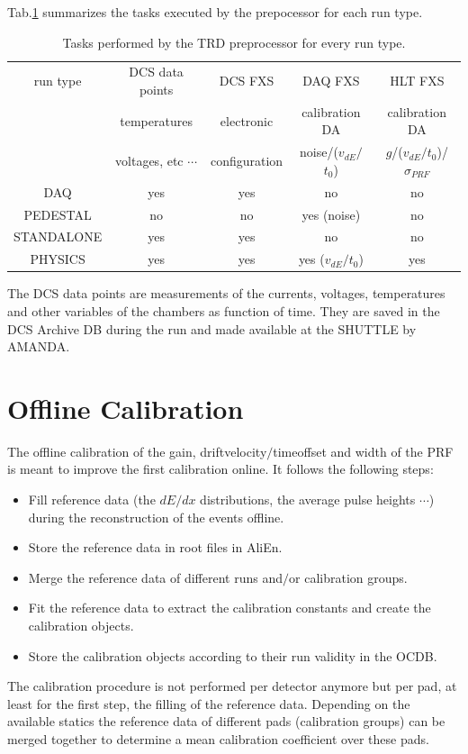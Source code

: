 \documentclass{alicetdr}
\begin{document}
Tab.\ref{taskruntype} summarizes the tasks executed by the prepocessor
for each run type.
\begin{table}[h]
\begin{center}
\begin{tabular} {|c|c|c|c|c|}
\hline run type & DCS data points  & DCS FXS & DAQ FXS & HLT FXS  \\
 & temperatures  & electronic  & calibration DA  & calibration DA   \\
 & voltages, etc $\cdots$  &  configuration & noise/($v_{dE}$$/$$t_{0}$)
& $g$/($v_{dE}$$/$$t_{0}$)/$\sigma_{PRF}$   \\
\hline DAQ   & yes & yes & no & no \\\hline
\hline PEDESTAL   & no & no & yes (noise) & no \\\hline
\hline STANDALONE & yes & yes & no & no \\\hline
\hline PHYSICS & yes & yes & yes ($v_{dE}$$/$$t_{0}$) & yes \\\hline
\end{tabular}
\caption{\label{taskruntype} Tasks performed by the TRD preprocessor
for every run type.}
\end{center}
\end{table}
The DCS data points are measurements of the currents, voltages,
temperatures and other variables of the chambers as function of time.
They are saved in the DCS Archive DB during the run and made available
at the SHUTTLE by AMANDA.
%
\section{Offline Calibration}
The offline calibration of the gain, driftvelocity$/$timeoffset and
width of the PRF is meant to improve the first calibration online.
It follows the following steps:
\begin{itemize}
\item Fill reference data (the $dE/dx$ distributions, the average
pulse heights $\cdots$) during the reconstruction of the events offline.
\item Store the reference data in root files in AliEn.
\item Merge the reference data of different runs and$/$or calibration groups.
\item Fit the reference data to extract the calibration constants and
create the calibration objects.
\item Store the calibration objects according to their run validity in
the OCDB.
\end{itemize}
The calibration procedure is not performed per detector anymore but per
pad, at least for the first step, the filling of the reference data.
Depending on the available statics the reference data of different pads
(calibration groups) can be merged together to determine a mean
calibration coefficient over these pads.
\end{document}
